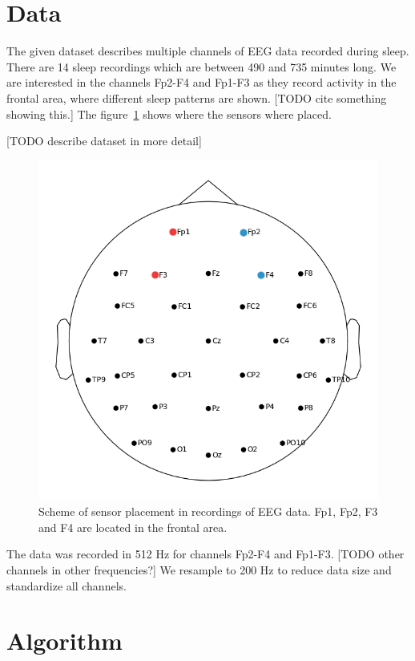 \section{Data}
\label{sec:data}

The given dataset describes multiple channels of EEG data recorded during sleep. There are 14 sleep recordings which are between 490 and 735 minutes long. We are interested in the channels Fp2-F4 and Fp1-F3 as they record activity in the frontal area, where different sleep patterns are shown. [TODO cite something showing this.] The figure~\ref{fig:head_placement} shows where the sensors where placed.

[TODO describe dataset in more detail]

\begin{figure}
	\centering
	\includegraphics[width=0.7\linewidth]{figs/head_placement}
	\caption{Scheme of sensor placement in recordings of EEG data. Fp1, Fp2, F3 and F4 are located in the frontal area.}
	\label{fig:head_placement}
\end{figure}


The data was recorded in 512 Hz for channels Fp2-F4 and Fp1-F3. [TODO other channels in other frequencies?] We resample to 200 Hz to reduce data size and standardize all channels.

\section{Algorithm}
\label{sec:algorithm}

